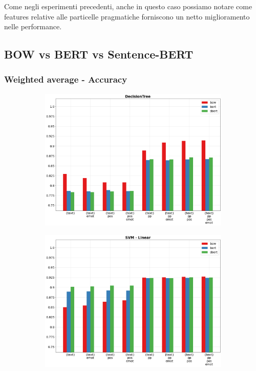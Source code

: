 \documentclass[oneside]{book}
\begin{document}
Come negli esperimenti precedenti, anche in questo caso possiamo notare come features relative alle particelle pragmatiche forniscono un netto miglioramento nelle performance.

\newpage

\subsection{BOW vs BERT vs Sentence-BERT}

\subsubsection{Weighted average - Accuracy}

\begin{figure}[!h]
	\hspace*{-3cm}
	\begin{subfigure}[b]{0.5\textwidth}
		\centering
		\includegraphics[width=10cm]{assets/reports/text/acc/DecisionTree.png}
	\end{subfigure}
	\hfill
	\begin{subfigure}[b]{0.5\textwidth}		
		\centering
		\hspace*{0.15cm}
		\includegraphics[width=10cm]{assets/reports/text/acc/SVM - Linear.png}
	\end{subfigure}
\end{figure}
\end{document}
